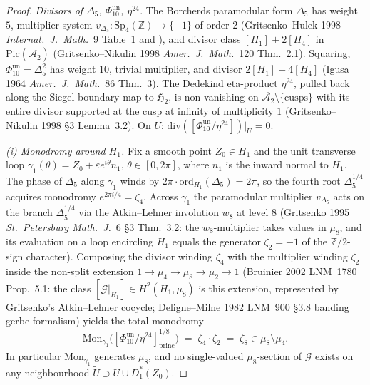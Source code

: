 \begin{proof}
\emph{Divisors of $\Delta_5$, $\Phi_{10}^{\mathrm{un}}$, $\eta^{24}$.}
The Borcherds paramodular form $\Delta_5$ has weight $5$, multiplier
system $v_{\Delta_5}\colon\mathrm{Sp}_4(\mathbb Z)\to\{\pm 1\}$ of order $2$
(Gritsenko--Hulek 1998 \emph{Internat.~J.~Math.}~9 Table~1 and
\cite{VolI}), and divisor class $[H_1]+2[H_4]$ in
$\mathrm{Pic}(\overline{\mathcal A_2})$ (Gritsenko--Nikulin 1998
\emph{Amer.\ J.\ Math.}~120 Thm.~2.1). Squaring,
$\Phi_{10}^{\mathrm{un}}=\Delta_5^2$ has weight $10$, trivial multiplier, and
divisor $2[H_1]+4[H_4]$ (Igusa 1964 \emph{Amer.\ J.\ Math.}~86
Thm.~3). The Dedekind eta-product $\eta^{24}$, pulled back along the
Siegel boundary map to $\mathfrak H_2$, is non-vanishing on
$\overline{\mathcal A_2}\setminus\{\mathrm{cusps}\}$ with its entire
divisor supported at the cusp at infinity of multiplicity $1$
(Gritsenko--Nikulin 1998 \S3 Lemma~3.2). On $U$:
$\mathrm{div}([\Phi_{10}^{\mathrm{un}}/\eta^{24}])|_U=0$.

\emph{(i) Monodromy around $H_1$.} Fix a smooth point $Z_0\in H_1$ and
the unit transverse loop
$\gamma_1(\theta)=Z_0+\varepsilon e^{i\theta}n_1$, $\theta\in[0,2\pi]$,
where $n_1$ is the inward normal to $H_1$. The phase of $\Delta_5$
along $\gamma_1$ winds by $2\pi\cdot\mathrm{ord}_{H_1}(\Delta_5)=2\pi$,
so the fourth root $\Delta_5^{1/4}$ acquires monodromy
$e^{2\pi i/4}=\zeta_4$. Across $\gamma_1$ the paramodular multiplier
$v_{\Delta_5}$ acts on the branch $\Delta_5^{1/4}$ via the
Atkin--Lehner involution $w_8$ at level $8$
(Gritsenko 1995 \emph{St.~Petersburg Math.~J.}~6 \S3 Thm.~3.2: the
$w_8$-multiplier takes values in $\mu_8$, and its evaluation on a
loop encircling $H_1$ equals the generator $\zeta_2=-1$ of the
$\mathbb Z/2$-sign character).
Composing the divisor winding $\zeta_4$ with the multiplier winding
$\zeta_2$ inside the non-split extension
$1\to\mu_4\to\mu_8\to\mu_2\to 1$
(Bruinier 2002 LNM~1780 Prop.~5.1: the class
$[\mathcal G|_{H_1}]\in H^2(H_1,\mu_8)$ is this extension, represented
by Gritsenko's Atkin--Lehner cocycle; Deligne--Milne 1982 LNM~900 \S3.8
banding gerbe formalism) yields the total monodromy
\[
 \mathrm{Mon}_{\gamma_1}\bigl([\Phi_{10}^{\mathrm{un}}/\eta^{24}]^{1/8}_{\mathrm{princ}}\bigr)
 \;=\;
 \zeta_4\cdot\zeta_2\;=\;\zeta_8\in\mu_8\setminus\mu_4.
\]
In particular $\mathrm{Mon}_{\gamma_1}$ generates $\mu_8$, and no
single-valued $\mu_8$-section of $\mathcal G$ exists on any
neighbourhood $\widetilde U\supset U\cup D^*_1(Z_0)$.


\end{proof}
